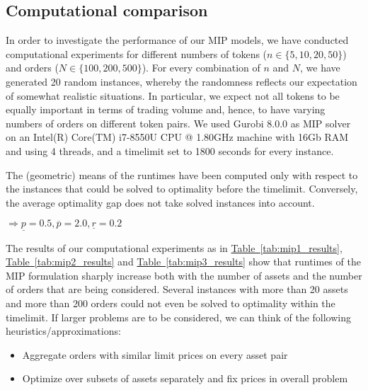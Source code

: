 \documentclass[11pt,parskip=full]{scrartcl}%
\newcommand*{\wrt}{with respect to }
\newcommand*{\tabref}[1]{\hyperref[{#1}]{Table~\ref*{#1}}}
\begin{document}
\newpage
\subsection{Computational comparison}
\label{subsec:computational_comparison}


In order to investigate the performance of our MIP models, we have conducted computational
experiments for different numbers of tokens ($ n \in \{5,10,20,50\} $) and orders ($ N \in 
\{100,200,500\} $).
For every combination of $ n $ and $ N $, we have generated 20 random instances, whereby the
randomness reflects our expectation of somewhat realistic situations.
In particular, we expect not all tokens to be equally important in terms of trading volume and,
hence, to have varying numbers of orders on different token pairs.
We used Gurobi 8.0.0 as MIP solver on an Intel(R) Core(TM) i7-8550U CPU @ 1.80GHz machine with 16Gb
RAM and using 4 threads, and a timelimit set to 1800 seconds for every instance.

The (geometric) means of the runtimes have been computed only \wrt the instances that could be
solved to optimality before the timelimit. Conversely, the average optimality gap does not take
solved instances into account.

$ \Rightarrow \underline{p}=0.5, \overline{p}=2.0, \underline{r}=0.2 $

The results of our computational experiments as in \tabref{tab:mip1_results},
\tabref{tab:mip2_results} and \tabref{tab:mip3_results} show that runtimes of the MIP formulation
sharply increase both with the number of assets and the number of orders that are being considered.
Several instances with more than 20 assets and more than 200 orders could not even be solved to
optimality within the timelimit.
If larger problems are to be considered, we can think of the following heuristics/approximations:
\begin{itemize}
    \item Aggregate orders with similar limit prices on every asset pair
    \item Optimize over subsets of assets separately and fix prices in overall problem
\end{itemize}
\end{document}

